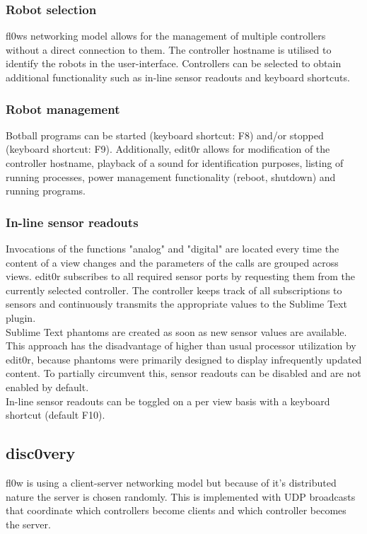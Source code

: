 \documentclass[conference]{IEEEtran}
\begin{document}
\subsubsection{Robot selection}
fl0ws networking model allows for the management of multiple controllers without a direct connection to them. The controller hostname is utilised to identify the robots in the user-interface. Controllers can be selected to obtain additional functionality such as in-line sensor readouts and keyboard shortcuts.\\

\subsubsection{Robot management}
Botball programs can be started (keyboard shortcut: F8) and/or stopped (keyboard shortcut: F9).
Additionally, edit0r allows for modification of the controller hostname, playback of a sound for identification purposes, listing of running processes, power management functionality (reboot, shutdown) and running programs.\\

\subsubsection{In-line sensor readouts}
Invocations of the functions "analog" and "digital" are located every time the content of a view changes and the parameters of the calls are grouped across views. edit0r subscribes to all required sensor ports by requesting them from the currently selected controller. The controller keeps track of all subscriptions to sensors and continuously transmits the appropriate values to the Sublime Text\cite{Sublime Text 3:Sublime HQ} plugin. \\Sublime Text \cite{Sublime Text 3:Sublime HQ} phantoms are created as soon as new sensor values are available. This approach has the disadvantage of higher than usual processor utilization by edit0r, because phantoms were primarily designed to display infrequently updated content. To partially circumvent this, sensor readouts can be disabled and are not enabled by default.\\
In-line sensor readouts can be toggled on a per view basis with a keyboard shortcut (default F10).\\

\subsection{disc0very}
fl0w is using a client-server networking model but because of it's distributed nature the server is chosen randomly. This is implemented with UDP broadcasts that coordinate which controllers become clients and which controller becomes the server.
\end{document}
